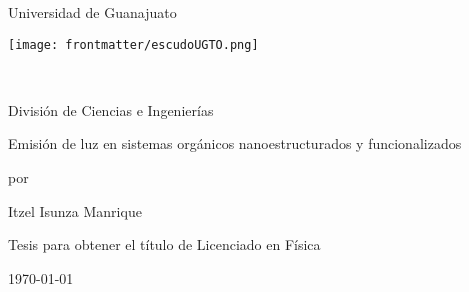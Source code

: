 \begin{titlepage}
\begin{center}
{\LARGE{Universidad de Guanajuato\\
\vspace{.7cm}

   {{\texttt{[image: frontmatter/escudoUGTO.png]}}
   {\\
   \vspace{0.7cm}

{{{{{\LARGE Divisi\'on de Ciencias e Ingenier\'ias}}}}}\\   
    \vspace{.1cm}
   }}}}
\vspace{1.3cm}

{\ttfamily
{\Huge  Emisi\'on de luz en  \vspace{0.2cm}sistemas org\'anicos nanoestructurados  \vspace{0.2cm}y funcionalizados}
\vspace{0.5cm}

{\large{por}}
\vspace{0.5cm}

{\LARGE {Itzel Isunza Manrique}}
\vspace{0.6cm}
}

{\large Tesis para obtener el t\'itulo de Licenciado en F\'isica }

\vspace{1.1cm}

{\large{}}
\vspace{0.5cm}
{\large{}}


\vfill
\vspace{0.9cm}
\today
\end{center}
\end{titlepage}

